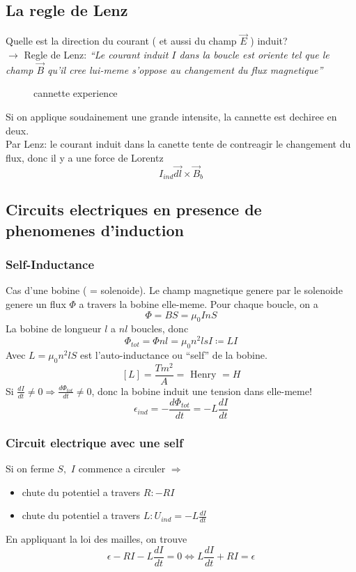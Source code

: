 \documentclass[../main.tex]{subfiles}
\begin{document}
\subsection{La regle de Lenz}
Quelle est la direction du courant  ( et aussi du champ $\vec{E}$ ) induit?\\
$\to $ Regle de Lenz:
\textit { ``Le courant induit $I$ dans la boucle est oriente tel que le champ $\vec{B}$ qu'il cree lui-meme s'oppose au changement du flux magnetique'' } 
\begin{exemple}
\begin{figure}[H]
    \centering
    \caption{cannette experience}
    \label{fig:cannette-experience}
\end{figure}
Si on applique soudainement une grande intensite, la cannette est dechiree en deux.\\
Par Lenz: le courant induit dans la canette tente de contreagir le changement du flux, donc il y a une force de Lorentz
\[ 
I_{ind} \vec{dl} \times \vec{B}_b
\]
\end{exemple}
\subsection{Circuits electriques en presence de phenomenes d'induction}
\subsubsection{Self-Inductance}
Cas d'une bobine ( = solenoide).
Le champ magnetique genere par le solenoide genere un flux $\Phi$ a travers la bobine elle-meme.
Pour chaque boucle, on a 
\[ 
\Phi = BS = \mu_0 I n S
\]
La bobine de longueur $l$  a $nl$ boucles, donc
\[ 
\Phi_{tot} = \Phi n l = \mu_0 n^{2} l sI \coloneqq LI
\]
Avec $L = \mu_0 n^{2} lS$ est l'auto-inductance ou ``self'' de la bobine. 
\[ 
[ L] = \frac{Tm^{2}}{A}= \text{ Henry } = H
\]
Si $\frac{dI}{dt}\neq 0 \Rightarrow  \frac{d \Phi_{tot}}{ dt} \neq 0$, donc la bobine induit une tension dans elle-meme!
\[ 
\epsilon_{ind} = - \frac{d \Phi_{tot} }{dt}= - L \frac{dI}{dt}
\]
\subsubsection{Circuit electrique avec une self}
Si on ferme $S,$ $I$ commence a circuler $\Rightarrow$ 
\begin{itemize}
\item chute du potentiel a travers $R: -RI$ 
\item chute du potentiel a travers $L: U_{ind} = - L \frac{dI }{dt}$ 
\end{itemize}
En appliquant la loi des mailles, on trouve
\[ 
\epsilon - RI - L \frac{dI}{dt}=0 \iff L \frac{dI}{dt}+ RI = \epsilon
\]
\end{document}
